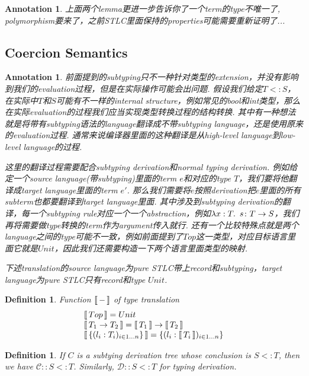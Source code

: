 \documentclass{article}
\theoremstyle{plain}
\newtheorem{definition}[theorem]{Definition}
\newtheorem{annotation}[theorem]{Annotation}
\theoremstyle{nonumberplain}
\newcommand{\lam}[2]{\ensuremath{\lambda #1\ldotp~ #2}} %
\newcommand{\termtype}[2]{\ensuremath{#1:#2}}
\newcommand{\subtyp}[2]{#1<:#2}
\newcommand{\dbracket}[1]{\ensuremath{\left\llbracket\,\vcenter{\hbox{$#1$}}\,\right\rrbracket}}
\begin{document}
\begin{annotation}
\rm 上面两个lemma更进一步告诉你了一个term的type不唯一了, polymorphism要来了，之前STLC里面保持的properties可能需要重新证明了...
\end{annotation}

\newpage
\subsection{Coercion Semantics}


\begin{annotation}
\rm 前面提到的subtyping只不一种针对类型的extension，并没有影响到我们的evaluation过程，但是在实际操作可能会出问题. 假设我们给定$\subtyp{T}{S}$，在实际中$T$和$S$可能有不一样的internal structure，例如常见的bool和int类型，那么在实际evaluation的过程我们应当实现类型转换过程的结构转换. 其中有一种想法就是将带有subtyping语法的language翻译成不带subtyping language，还是使用原来的evaluation过程. 通常来说编译器里面的这种翻译是从high-level language到low-level language的过程. 

这里的翻译过程需要配合subtyping derivation和normal typing derivation. 例如给定一个source language(带subtyping)里面的term $e$和对应的type $T$，我们要将他翻译成target language里面的term $e'$. 那么我们需要将$e$按照derivation把$e$里面的所有subterm也都要翻译到target language里面. 其中涉及到subtyping derivation的翻译，每一个subtyping rule对应一个一个abstraction，例如$\lam{\termtype{x}{T}}{s}\colon T \to S$，我们再将需要做type转换的term作为argument传入就行. 还有一个比较特殊点就是两个language之间的type可能不一致，例如前面提到了$Top$这一类型，对应目标语言里面它就是$Unit$，因此我们还需要构造一下两个语言里面类型的映射. 

下述translation的source language为pure STLC带上record和subtyping，target language为pure STLC只有record和type $Unit$. 
\end{annotation}

\begin{definition}
\rm Function $\dbracket{-}$ of type translation
$$
\begin{array}{ll}
\dbracket{Top} = Unit \\
\dbracket{T_1 \to T_2} = \dbracket{T_1} \to \dbracket{T_2} \\
\dbracket{\{(l_i:T_i)_{i \in 1 \ldots n}\}} = \left\{(l_i:\dbracket{T_i})_{i \in 1 \ldots n}\right\} 
\end{array}
$$
\end{definition}


\begin{definition}
\rm If $C$ is a subtying derivation tree whose conclusion is $\subtyp{S}{T}$, then we have $\mathcal{C}::\subtyp{S}{T}$. Similarly, $\mathcal{D}::\subtyp{S}{T}$ for typing derivation. 
\end{definition}
\end{document}
